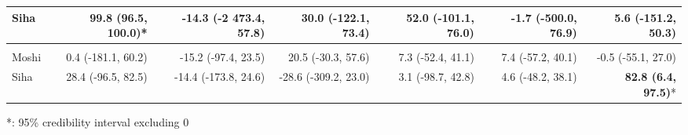 \begin{table}[t]
\begin{tabular*}{\linewidth}{@{\extracolsep{\fill}}l|rrrrrr}
Siha & \textbf{99.8 (96.5, 100.0)}* & -14.3 (-2 473.4, 57.8) & 30.0 (-122.1, 73.4) & 52.0 (-101.1, 76.0) & -1.7 (-500.0, 76.9) & 5.6 (-151.2, 50.3) \\ 
\midrule\addlinespace[2.5pt]
\multicolumn{7}{l}{Schistosomiasis} \\[2.5pt] 
\midrule\addlinespace[2.5pt]
Moshi & 0.4 (-181.1, 60.2) & -15.2 (-97.4, 23.5) & 20.5 (-30.3, 57.6) & 7.3 (-52.4, 41.1) & 7.4 (-57.2, 40.1) & -0.5 (-55.1, 27.0) \\ 
Siha & 28.4 (-96.5, 82.5) & -14.4 (-173.8, 24.6) & -28.6 (-309.2, 23.0) & 3.1 (-98.7, 42.8) & 4.6 (-48.2, 38.1) & \textbf{82.8 (6.4, 97.5)}* \\ 
\bottomrule
\end{tabular*}
\begin{minipage}{\linewidth}
*: 95\% credibility interval excluding 0\\
\end{minipage}
\end{table}


